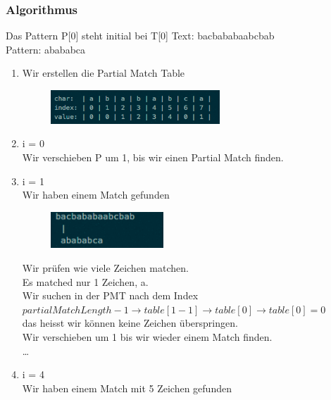 \documentclass[a4paper,10pt]{report}
\begin{document}
\subsubsection{Algorithmus}
Das Pattern P[0] steht initial bei T[0]
Text: bacbababaabcbab\\
Pattern: abababca\\
\begin{enumerate}
	\item
		Wir erstellen die Partial Match Table
		\begin{figure}[H]
			\begin{center}
  				\includegraphics[width=0.6\textwidth]{img/kmpexampletable.png}
			\end{center}
		\end{figure}
	\item
		i = 0\\
		Wir verschieben P um 1, bis wir einen Partial Match finden.
	\item
		i = 1\\
		Wir haben einem Match gefunden
		\begin{figure}[H]
			\begin{center}
  				\includegraphics[width=0.4\textwidth]{img/kmpalgo1.png}
			\end{center}
		\end{figure}
		Wir prüfen wie viele Zeichen matchen.\\
		Es matched nur 1 Zeichen, a.\\
		Wir suchen in der PMT nach dem Index\\
		 $partialMatchLength - 1 \to table[1 - 1] \to table[0] \to table[0] = 0$\\
		 das heisst wir können keine Zeichen überspringen.\\
		Wir verschieben um 1 bis wir wieder einem Match finden.\\
		\ldots
		\item
		i = 4\\
		Wir haben einem Match mit 5 Zeichen gefunden
		\begin{figure}[H]
			\begin{center}

\end{center}
\end{figure}
\end{enumerate}
\end{document}
